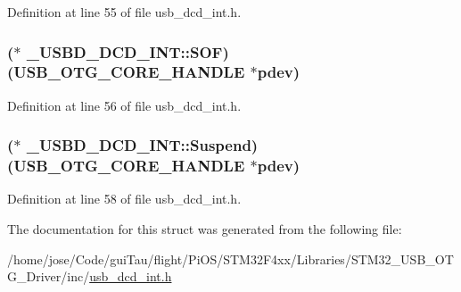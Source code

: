 Definition at line 55 of file usb\-\_\-dcd\-\_\-int.\-h.

\hypertarget{struct___u_s_b_d___d_c_d___i_n_t_ac5c247862c6c2c020fe0a21b21a4451c}{
\subsubsection[{S\-O\-F}]{($\ast$  \-\_\-\-U\-S\-B\-D\-\_\-\-D\-C\-D\-\_\-\-I\-N\-T\-::\-S\-O\-F)({\bf U\-S\-B\-\_\-\-O\-T\-G\-\_\-\-C\-O\-R\-E\-\_\-\-H\-A\-N\-D\-L\-E} $\ast$pdev)}}\label{struct___u_s_b_d___d_c_d___i_n_t_ac5c247862c6c2c020fe0a21b21a4451c}


Definition at line 56 of file usb\-\_\-dcd\-\_\-int.\-h.

\hypertarget{struct___u_s_b_d___d_c_d___i_n_t_af039a1639616118c047efc22d290dfbc}{
\subsubsection[{Suspend}]{($\ast$  \-\_\-\-U\-S\-B\-D\-\_\-\-D\-C\-D\-\_\-\-I\-N\-T\-::\-Suspend)({\bf U\-S\-B\-\_\-\-O\-T\-G\-\_\-\-C\-O\-R\-E\-\_\-\-H\-A\-N\-D\-L\-E} $\ast$pdev)}}\label{struct___u_s_b_d___d_c_d___i_n_t_af039a1639616118c047efc22d290dfbc}


Definition at line 58 of file usb\-\_\-dcd\-\_\-int.\-h.



The documentation for this struct was generated from the following file\-:\begin{DoxyCompactItemize}
\item 
/home/jose/\-Code/gui\-Tau/flight/\-Pi\-O\-S/\-S\-T\-M32\-F4xx/\-Libraries/\-S\-T\-M32\-\_\-\-U\-S\-B\-\_\-\-O\-T\-G\-\_\-\-Driver/inc/\hyperlink{usb__dcd__int_8h}{usb\-\_\-dcd\-\_\-int.\-h}\end{DoxyCompactItemize}
